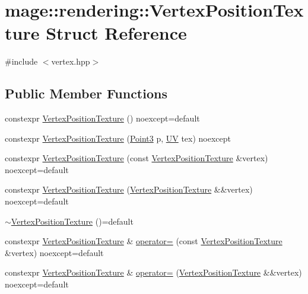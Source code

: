 \hypertarget{structmage_1_1rendering_1_1_vertex_position_texture}{}\section{mage\+:\+:rendering\+:\+:Vertex\+Position\+Texture Struct Reference}
\label{structmage_1_1rendering_1_1_vertex_position_texture}


{\ttfamily \#include $<$vertex.\+hpp$>$}

\subsection*{Public Member Functions}
\begin{DoxyCompactItemize}
\item 
constexpr \mbox{\hyperlink{structmage_1_1rendering_1_1_vertex_position_texture_ac9f9c56c37af249a5c37145d4fed90fb}{Vertex\+Position\+Texture}} () noexcept=default
\item 
constexpr \mbox{\hyperlink{structmage_1_1rendering_1_1_vertex_position_texture_a71b7340eb44f39977a0aa11254ba5970}{Vertex\+Position\+Texture}} (\mbox{\hyperlink{structmage_1_1_point3}{Point3}} p, \mbox{\hyperlink{structmage_1_1_u_v}{UV}} tex) noexcept
\item 
constexpr \mbox{\hyperlink{structmage_1_1rendering_1_1_vertex_position_texture_a71d4ad888123a6772fabc6ad4a57ec25}{Vertex\+Position\+Texture}} (const \mbox{\hyperlink{structmage_1_1rendering_1_1_vertex_position_texture}{Vertex\+Position\+Texture}} \&vertex) noexcept=default
\item 
constexpr \mbox{\hyperlink{structmage_1_1rendering_1_1_vertex_position_texture_a8375ccf375d78d9203b130cee95982f4}{Vertex\+Position\+Texture}} (\mbox{\hyperlink{structmage_1_1rendering_1_1_vertex_position_texture}{Vertex\+Position\+Texture}} \&\&vertex) noexcept=default
\item 
\mbox{\hyperlink{structmage_1_1rendering_1_1_vertex_position_texture_afe6c0d05326d35c13f5d505065235691}{$\sim$\+Vertex\+Position\+Texture}} ()=default
\item 
constexpr \mbox{\hyperlink{structmage_1_1rendering_1_1_vertex_position_texture}{Vertex\+Position\+Texture}} \& \mbox{\hyperlink{structmage_1_1rendering_1_1_vertex_position_texture_aad5780884dc5ffe0b923885a4b67b83f}{operator=}} (const \mbox{\hyperlink{structmage_1_1rendering_1_1_vertex_position_texture}{Vertex\+Position\+Texture}} \&vertex) noexcept=default
\item 
constexpr \mbox{\hyperlink{structmage_1_1rendering_1_1_vertex_position_texture}{Vertex\+Position\+Texture}} \& \mbox{\hyperlink{structmage_1_1rendering_1_1_vertex_position_texture_a6bf7ada3b933e5790349225ee323db36}{operator=}} (\mbox{\hyperlink{structmage_1_1rendering_1_1_vertex_position_texture}{Vertex\+Position\+Texture}} \&\&vertex) noexcept=default
\end{DoxyCompactItemize}
